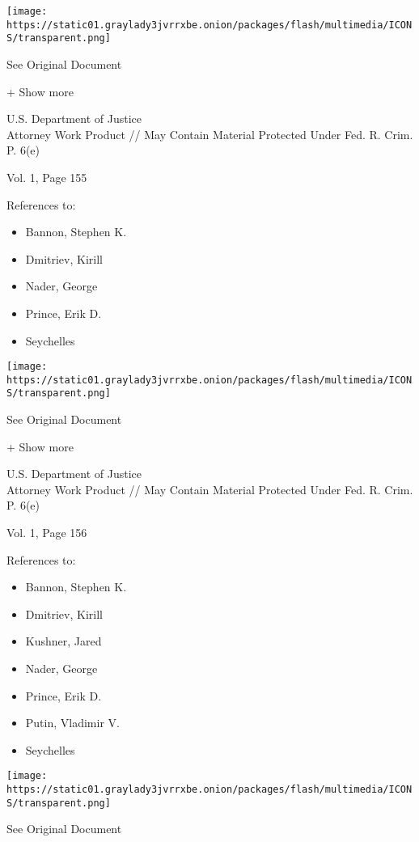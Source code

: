 \protect\hyperlink{}{}

\texttt{[image: https://static01.graylady3jvrrxbe.onion/packages/flash/multimedia/ICONS/transparent.png]}

See Original Document

+ Show more

U.S. Department of Justice\\
Attorney Work Product // May Contain Material Protected Under Fed. R.
Crim. P. 6(e)

Vol. 1, Page 155

References to:

\begin{itemize}
\tightlist
\item
  Bannon, Stephen K.
\item
  Dmitriev, Kirill
\item
  Nader, George
\item
  Prince, Erik D.
\item
  Seychelles
\end{itemize}

\protect\hyperlink{}{}

\texttt{[image: https://static01.graylady3jvrrxbe.onion/packages/flash/multimedia/ICONS/transparent.png]}

See Original Document

+ Show more

U.S. Department of Justice\\
Attorney Work Product // May Contain Material Protected Under Fed. R.
Crim. P. 6(e)

Vol. 1, Page 156

References to:

\begin{itemize}
\tightlist
\item
  Bannon, Stephen K.
\item
  Dmitriev, Kirill
\item
  Kushner, Jared
\item
  Nader, George
\item
  Prince, Erik D.
\item
  Putin, Vladimir V.
\item
  Seychelles
\end{itemize}

\protect\hyperlink{}{}

\texttt{[image: https://static01.graylady3jvrrxbe.onion/packages/flash/multimedia/ICONS/transparent.png]}

See Original Document

